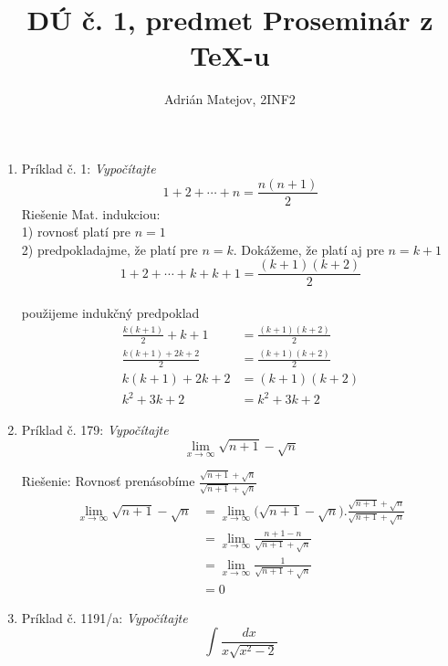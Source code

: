 \documentclass[12pt]{article}
\begin{document}
\title{%
    DÚ č. 1, predmet Proseminár z \TeX-u}

            \author{Adrián Matejov, 2INF2}

    \maketitle

	\begin{enumerate}
    \item Príklad č. 1: {\it Vypočítajte}
		$$1 + 2 + \cdots  + n = \frac{n(n+1)}{2}$$
		Riešenie Mat. indukciou:\\
		1) rovnosť platí pre $n=1$\\
		2) predpokladajme, že platí pre $n=k$. Dokážeme, že platí aj pre $n=k + 1$\\
		$$1 + 2 + \cdots  + k + k + 1 = \frac{(k+1)(k+2)}{2}$$\\
		použijeme indukčný predpoklad
        \begin{align*}
            \frac{k(k+1)}{2} + k + 1 &= \frac{(k+1)(k+2)}{2}\\
            \frac{k(k+1)+2k+2}{2} &= \frac{(k+1)(k+2)}{2}\\
            k(k+1)+2k+2 &= (k+1)(k+2)\\
            k^{2} + 3k + 2 &= k^{2} + 3k + 2
        \end{align*}

    \item Príklad č. 179: {\it Vypočítajte}
        \[ \lim_{x \to \infty} \sqrt{n+1}-\sqrt{n} \]

        Riešenie: Rovnosť prenásobíme $\frac{\sqrt{n+1}+\sqrt{n}}{\sqrt{n+1}+\sqrt{n}}$
        \begin{align*}
            \lim_{x \to \infty} \sqrt{n+1}-\sqrt{n}
            &= \lim_{x \to \infty} \bigg(\sqrt{n+1}-\sqrt{n}\bigg).\frac{\sqrt{n+1}+\sqrt{n}}{\sqrt{n+1}+\sqrt{n}} \\
            &= \lim_{x \to \infty} \frac{n+1-n}{\sqrt{n+1}+\sqrt{n}} \\
            &= \lim_{x \to \infty} \frac{1}{\sqrt{n+1}+\sqrt{n}} \\
            &= 0
        \end{align*}

    \item Príklad č. 1191/a: {\it Vypočítajte}
        $$\int\frac{dx}{x\sqrt{x^{2}-2}}$$


\end{enumerate}
\end{document}

